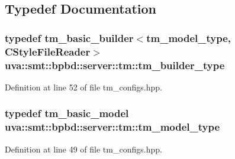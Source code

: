 \subsection{Typedef Documentation}
\hypertarget{namespaceuva_1_1smt_1_1bpbd_1_1server_1_1tm_aadb8523778a8cfd88a607258658436fc}{}
\subsubsection[{tm\+\_\+builder\+\_\+type}]{\setlength{\rightskip}{0pt plus 5cm}typedef {\bf tm\+\_\+basic\+\_\+builder}$<${\bf tm\+\_\+model\+\_\+type}, {\bf C\+Style\+File\+Reader}$>$ {\bf uva\+::smt\+::bpbd\+::server\+::tm\+::tm\+\_\+builder\+\_\+type}}\label{namespaceuva_1_1smt_1_1bpbd_1_1server_1_1tm_aadb8523778a8cfd88a607258658436fc}


Definition at line 52 of file tm\+\_\+configs.\+hpp.

\hypertarget{namespaceuva_1_1smt_1_1bpbd_1_1server_1_1tm_a2f41d3b9fcee3dddc005fd7e7deae402}{}
\subsubsection[{tm\+\_\+model\+\_\+type}]{\setlength{\rightskip}{0pt plus 5cm}typedef {\bf tm\+\_\+basic\+\_\+model} {\bf uva\+::smt\+::bpbd\+::server\+::tm\+::tm\+\_\+model\+\_\+type}}\label{namespaceuva_1_1smt_1_1bpbd_1_1server_1_1tm_a2f41d3b9fcee3dddc005fd7e7deae402}


Definition at line 49 of file tm\+\_\+configs.\+hpp.

